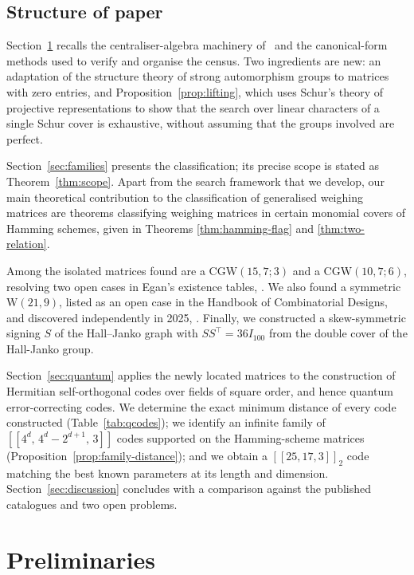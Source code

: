 \documentclass{article}
\theoremstyle{definition}
\theoremstyle{remark}
\newcommand{\CGW}{\mathrm{CGW}}
\newcommand{\We}{\mathrm{W}}
\begin{document}
\subsection{Structure of paper}

Section~\ref{sec:prelim} recalls the centraliser-algebra machinery
of~\cite{Monrep} and the canonical-form methods used to verify and
organise the census. Two ingredients are new: an adaptation of the
structure theory of strong automorphism groups to matrices with zero
entries, and Proposition~\ref{prop:lifting}, which uses Schur's theory of
projective representations to show that the search over linear characters
of a single Schur cover is exhaustive, without assuming that the groups involved are perfect.

Section~\ref{sec:families} presents the classification; its precise scope
is stated as Theorem~\ref{thm:scope}. Apart from the search framework that we develop, our main theoretical contribution to the classification of generalised weighing matrices are theorems classifying weighing matrices in certain monomial covers of Hamming schemes, given in Theorems \ref{thm:hamming-flag} and \ref{thm:two-relation}. 

Among the isolated matrices found are a $\CGW(15,7;3)$ and a $\CGW(10,7;6)$, resolving two open cases in Egan's existence tables, \cite{CGW-Survey}. We also found a symmetric $\We(21,9)$, listed as an open case in the Handbook of Combinatorial
Designs, and discovered independently in 2025, \cite{Handbook2007, Rosin2025}. Finally, we constructed a skew-symmetric signing $S$ of the Hall--Janko graph with $SS^{\top} = 36I_{100}$ from the double cover of the Hall-Janko group. 

Section~\ref{sec:quantum} applies the newly located matrices to the construction of Hermitian self-orthogonal codes over fields of square order, and hence quantum error-correcting codes.  We determine the exact minimum distance of every code constructed (Table~\ref{tab:qcodes}); we identify an infinite family of $[[4^d,\, 4^d - 2^{d+1},\, 3]]$ codes supported on the Hamming-scheme matrices (Proposition~\ref{prop:family-distance}); and we obtain a $[[25,17,3]]_2$ code matching the best known parameters at its length and dimension.  Section~\ref{sec:discussion} concludes with a comparison against the published catalogues and two open problems.

\section{Preliminaries}\label{sec:prelim}
\end{document}
